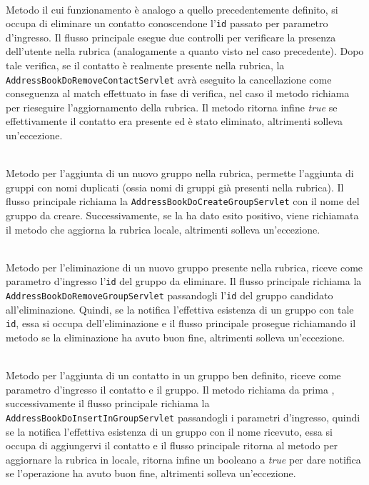 \begin{description}
	\item{}\\
Metodo il cui funzionamento è analogo a quello precedentemente definito, si occupa di eliminare un contatto conoscendone l'\texttt{id} passato per parametro d'ingresso. Il flusso principale esegue due controlli per verificare la presenza dell'utente nella rubrica (analogamente a quanto visto nel caso precedente). 
Dopo tale verifica, se il contatto è realmente presente nella rubrica, la  \texttt{AddressBookDoRemoveContactServlet} avrà eseguito la cancellazione come conseguenza al match effettuato in fase di verifica, nel caso il metodo richiama  per rieseguire l'aggiornamento della rubrica. Il metodo ritorna infine \textit{true} se effettivamente il contatto era presente ed è stato eliminato, altrimenti solleva un'eccezione.

	\item{}\\
	Metodo per l'aggiunta di un nuovo gruppo nella rubrica, permette l'aggiunta di gruppi con nomi duplicati (ossia nomi di gruppi già presenti nella rubrica). Il flusso principale richiama la  \texttt{AddressBookDoCreateGroupServlet} con il nome del gruppo da creare. Successivamente, se la  ha dato  esito positivo, viene richiamata il metodo  che aggiorna la rubrica locale, altrimenti solleva un'eccezione.
	
	\item{}\\
	Metodo per l'eliminazione di un nuovo gruppo presente nella rubrica, riceve come parametro d'ingresso l'\texttt{id} del gruppo da eliminare. Il flusso principale richiama la  \texttt{AddressBookDoRemoveGroupServlet} passandogli l'\texttt{id} del gruppo candidato all'eliminazione. Quindi, se la  notifica l'effettiva esistenza di un gruppo con tale \texttt{id}, essa si occupa dell'eliminazione e il flusso principale prosegue richiamando il metodo  se la eliminazione ha avuto buon fine, altrimenti solleva un'eccezione.
	
	\item{}\\
	Metodo per l'aggiunta di un contatto in un gruppo ben definito, riceve come parametro d'ingresso il contatto e il gruppo.
Il metodo richiama da prima , successivamente il flusso principale richiama la  \texttt{AddressBookDoInsertInGroupServlet} passandogli i parametri d'ingresso, quindi se la  notifica l'effettiva esistenza di un gruppo con il nome ricevuto, essa si occupa di aggiungervi il contatto e il flusso principale ritorna al metodo  per aggiornare la rubrica in locale, ritorna infine un  booleano a \textit{true} per dare notifica se l'operazione ha avuto buon fine, altrimenti solleva un'eccezione.
	

\end{description}
